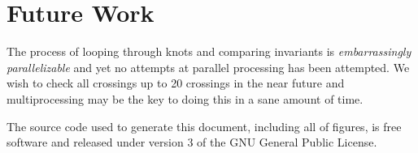\documentclass{article}
\theoremstyle{plain}
\begin{document}
    \section{Future Work}
        The process of looping through knots and comparing invariants is
        \textit{embarrassingly parallelizable} and yet no attempts at
        parallel processing has been attempted. We wish to check all crossings
        up to 20 crossings in the near future and multiprocessing may be the
        key to doing this in a sane amount of time.
    \newpage
    
    
    \newpage
    The source code used to generate this document, including all of figures,
    is free software and released under version 3 of the GNU General Public
    License.
\end{document}
